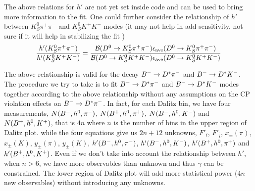 The above relations for $h'$ are not yet set inside code and can be used to bring more information to the fit.
One could further consider the relationship of $h'$ between $K_S^0 \pi^+ \pi^-$ and $K_S^0 K^+ K^-$ modes (it may not help in add sensitivity, not sure if it will help in stabilizing the fit )
\begin{equation}
\frac{h'(K_S^0 \pi^+ \pi^-)}{h'(K_S^0 K^+ K^-)} = \frac{{\mathcal{B}}(D^0 \rightarrow K_S^0 \pi^+\pi^-)\epsilon_{\textrm{ave}}(D^0 \rightarrow K_S^0 \pi^+ \pi^-)}{{\mathcal{B}}(D^0 \rightarrow K_S^0 K^+K^-)\epsilon_{\textrm{ave}}(D^0 \rightarrow K_S^0 K^+ K^-)}
\end{equation}


The above relationship is valid for the decay ${{{B}^-}} \rightarrow {\ensuremath{{D}^*}} \pi^-$ and ${{{B}^-}} \rightarrow {\ensuremath{{D}^*}} K^-$. 
The procedure we try to take is to fit ${{{B}^-}} \rightarrow {\ensuremath{{D}^*}} \pi^-$ and ${{{B}^-}} \rightarrow {\ensuremath{{D}^*}} K^-$ modes together according to the above relationship without any assumptions on the CP violation effects on ${{{B}^-}} \rightarrow {\ensuremath{{D}^*}} \pi^-$.
In fact, for each Dalitz bin, we have four measurements, $N({{{B}^-}}, h^0, \pi^-)$, $N({{{B}^+}}, h^0, \pi^+)$, $N({{{B}^-}}, h^0, K^-)$ and $N({{{B}^+}}, h^0, K^+)$, that is $4n$ where $n$ is the number of bins in the upper region of Dalitz plot.
while the four equations give us $2n + 12$ unknowns, $F'_i$, $F'_{\bar{i}}$, $x_{\pm}(\pi)$, $x_{\pm}(K)$, $y_{\pm}(\pi)$, $y_{\pm}(K)$, $h'({{{B}^-}}, h^0, \pi^-)$, $h'({{{B}^-}}, h^0, K^-)$, $h'({{{B}^+}}, h^0, \pi^+)$ and $h'({{{B}^+}}, h^0, K^+)$.
Even if we don't take into account the relationship between $h'$, when $n > 6$, we have more observables than unknown and thus $\gamma$ can be constrained.
 The lower region of Dalitz plot will add more statistical power ($4n$ new observables) without introducing any unknowns.
